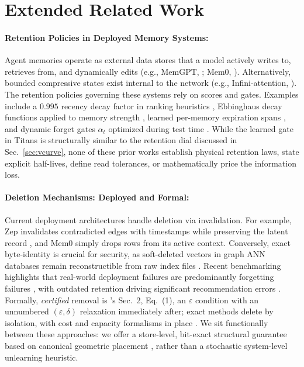 \documentclass{article}
\begin{document}
\appendix
\section{Extended Related Work}\label{app:related}

\paragraph{Retention Policies in Deployed Memory Systems:}
Agent memories operate as external data stores that a model actively writes to, retrieves from, and dynamically edits (e.g., MemGPT, \citealp{packer_memgpt_2024}; Mem0, \citealp{chhikara_mem0_2025}). Alternatively, bounded compressive states exist internal to the network (e.g., Infini-attention, \citealp{munkhdalai_leave_2024}). The retention policies governing these systems rely on scores and gates. Examples include a $0.995$ recency decay factor in ranking heuristics \citep{park_generative_2023}, Ebbinghaus decay functions applied to memory strength \citep{zhong_memorybank_2023}, learned per-memory expiration spans \citep{sukhbaatar_not_2021}, and dynamic forget gates $\alpha_t$ optimized during test time \citep{behrouz_titans_2024}. While the learned gate in Titans \citep{behrouz_titans_2024} is structurally similar to the retention dial discussed in Sec.~\ref{sec:vcurve}, none of these prior works establish physical retention laws, state explicit half-lives, define read tolerances, or mathematically price the information loss.

\paragraph{Deletion Mechanisms: Deployed and Formal:}
Current deployment architectures handle deletion via invalidation. For example, Zep invalidates contradicted edges with timestamps while preserving the latent record \citep{rasmussen_zep_2025}, and Mem0 simply drops rows from its active context. Conversely, exact byte-identity is crucial for security, as soft-deleted vectors in graph ANN databases remain reconstructible from raw index files \citep{chakraborttii_ghost_2026}. Recent benchmarking highlights that real-world deployment failures are predominantly forgetting failures \citep{yang_control-plane_2026}, with outdated retention driving significant recommendation errors \citep{uddin_recall_2026}. Formally, \emph{certified} removal is \citeauthor{guo_certified_2023}'s \citeyearpar{guo_certified_2023} Sec.~2, Eq.~(1), an $\varepsilon$ condition with an unnumbered $(\varepsilon,\delta)$ relaxation immediately after; exact methods delete by isolation, with cost and capacity formalisms in place \citep{bourtoule_machine_2019,ginart_making_2019,sekhari_remember_2021}. We sit functionally between these approaches: we offer a store-level, bit-exact structural guarantee based on canonical geometric placement \citep{blelloch_strongly_2007}, rather than a stochastic system-level unlearning heuristic.
\end{document}
